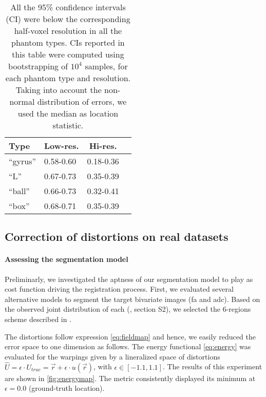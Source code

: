 \begin{table}
		\centering
		\footnotesize
    \begin{tabular}{llcc}
    Type      & Low-res.  & Hi-res. \\
    \hline
    ``gyrus'' & 0.58-0.60 & 0.18-0.36 \\
    ``L''     & 0.67-0.73 & 0.35-0.39 \\
    ``ball''  & 0.66-0.73 & 0.32-0.41 \\
    ``box''   & 0.68-0.71 & 0.35-0.39 \\
    \hline
    \end{tabular}
    \caption{All the 95\% confidence intervals (CI) were below the corresponding
      half-voxel resolution in all the phantom types.
    CIs reported in this table were computed using bootstrapping of $10^4$ samples,
      for each phantom type and resolution.
    Taking into account the non-normal distribution of errors, we used the median as location
  		statistic.}\label{tab:ci_phantom}
\end{table}

\subsection*{Correction of distortions on real datasets}\label{sec:results_hcp}

\paragraph*{Assessing the segmentation model}\label{sec:res_model_and_metric} %
%
Preliminarly, we investigated the aptness of our segmentation model to play as cost function
  driving the registration process.
First, we evaluated several alternative models to segment the target bivariate images
  (\gls*{fa} and \gls*{adc}).
Based on the observed joint distribution of each (\suppl{}, {\color{red} section S2}),
  we selected the 6-regions scheme described in .

The distortions follow expression \eqref{eq:fieldmap} and hence, we easily reduced the
  error space to one dimension as follows.
The energy functional \eqref{eq:energy} was evaluated for the warpings given by
  a lineralized space of distortions
  $\hat{U} = \epsilon \cdot U_{true} = \vec{r} + \epsilon \cdot u(\vec{r})$,
  with $\epsilon \in [-1.1, 1.1]$.
The results of this experiment are shown in \autoref{fig:energymap}.
The metric consistently displayed its minimum at $\epsilon=0.0$ (ground-truth location).


